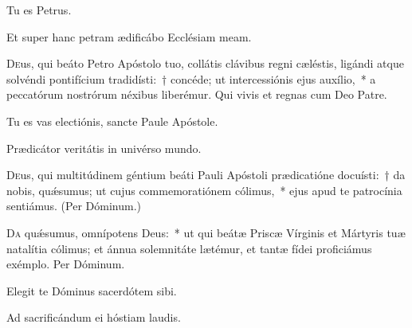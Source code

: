 \documentclass[vesperale_romanum.tex]{subfiles}
\begin{document}
\label{vv_tu_es_petrus}
 \vv Tu es Petrus.

\rr Et super hanc petram ædificábo Ecclésiam meam.


\oratio
\label{oratio_festo_cathedrae_s_petri}
\lettrine{D}{e}us, qui beáto Petro Apóstolo tuo, collátis clávibus regni cæléstis, ligándi atque solvéndi pontifícium tradidísti:~† concéde; ut intercessiónis ejus auxílio,~* a peccatórum nostrórum néxibus liberémur. Qui vivis et regnas cum Deo Patre.


\vv Tu es vas electiónis, sancte Paule Apóstole.

\rr Prædicátor veritátis in univérso mundo.
\label{oratio_s_pauli}
\oratio

\lettrine{D}{e}us, qui multitúdinem géntium beáti Pauli Apóstoli prædicatióne docuísti:~† da nobis, quǽsumus; ut cujus commemoratiónem cólimus,~* ejus apud te patrocínia sentiámus. (Per Dóminum.)



\oratio

\lettrine{D}{a} quǽsumus, omnípotens Deus:~* ut qui beátæ Priscæ Vírginis et Mártyris tuæ natalítia cólimus; et ánnua solemnitáte lætémur, et tantæ fídei proficiámus exémplo.
Per Dóminum.


 
 \hymnus
 \label{hy_quodcumque_in_orbe_solesmes_1961}
{}

\vv Elegit te Dóminus sacerdótem sibi.

\rr Ad sacrificándum ei hóstiam laudis.

\end{document}
